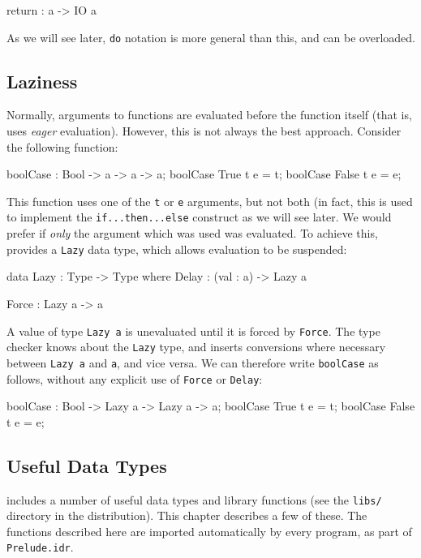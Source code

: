 \begin{code}
return : a -> IO a
\end{code}

\noindent
As we will see later, \texttt{do} notation is more general than this, and can be overloaded.

\subsection{Laziness}

\label{sect:lazy}
Normally, arguments to functions are evaluated before the function itself
(that is, \Idris{} uses \emph{eager} evaluation). However, this is not always
the best approach. Consider the following function:

\begin{code}
boolCase : Bool -> a -> a -> a;
boolCase True  t e = t;
boolCase False t e = e;
\end{code}

\noindent
This function uses one of the \texttt{t} or \texttt{e} arguments, but not both (in fact, this is used to implement the \texttt{if...then...else} construct as we will see later.
We would prefer if \emph{only} the argument which was used was evaluated.
To achieve this, \Idris{} provides a \texttt{Lazy} data type, which allows evaluation to be suspended:

\begin{code}
data Lazy : Type -> Type where
     Delay : (val : a) -> Lazy a

Force : Lazy a -> a
\end{code}

\noindent
A value of type \texttt{Lazy a} is unevaluated until it is forced by \texttt{Force}.
The \Idris{} type checker knows about the \texttt{Lazy} type, and inserts conversions where necessary between \texttt{Lazy a} and \texttt{a}, and vice versa.
We can therefore write \texttt{boolCase} as follows, without any explicit
use of \texttt{Force} or \texttt{Delay}:

\begin{code}
boolCase : Bool -> Lazy a -> Lazy a -> a;
boolCase True  t e = t;
boolCase False t e = e;
\end{code}


\subsection{Useful Data Types}

\Idris{} includes a number of useful data types and library functions (see the \texttt{libs/} directory in the distribution).
This chapter describes a few of these.
The functions described here are imported automatically by every \Idris{} program, as part of \texttt{Prelude.idr}.

